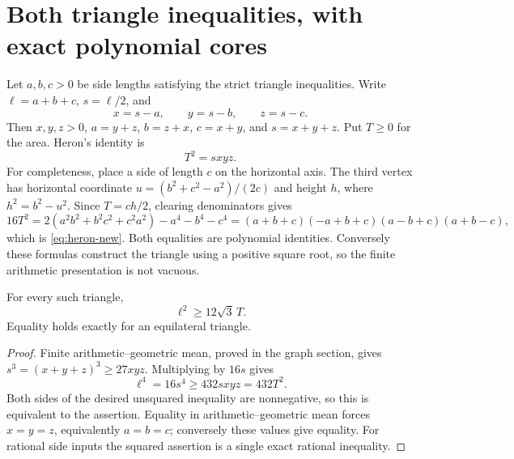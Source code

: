 \section{Both triangle inequalities, with exact polynomial cores}
\label{sec:triangles}

Let \(a,b,c>0\) be side lengths satisfying the strict triangle
inequalities. Write \(\ell=a+b+c\), \(s=\ell/2\), and
\[
 x=s-a,\qquad y=s-b,\qquad z=s-c.
\]
Then \(x,y,z>0\), \(a=y+z\), \(b=z+x\), \(c=x+y\),
and \(s=x+y+z\). Put \(T\geq0\) for the area. Heron's identity is
\begin{equation}\label{eq:heron-new}
 T^2=sxyz.
\end{equation}
For completeness, place a side of length \(c\) on the horizontal axis.
The third vertex has horizontal coordinate
\(u=(b^2+c^2-a^2)/(2c)\) and height \(h\), where
\(h^2=b^2-u^2\). Since \(T=ch/2\), clearing denominators gives
\[
 16T^2=2(a^2b^2+b^2c^2+c^2a^2)-a^4-b^4-c^4
 =(a+b+c)(-a+b+c)(a-b+c)(a+b-c),
\]
which is \eqref{eq:heron-new}. Both equalities are polynomial identities.
Conversely these formulas construct the triangle using a positive square
root, so the finite arithmetic presentation is not vacuous.

\begin{theorem}
For every such triangle,
\[
 \ell^2\geq12\sqrt3\,T.
\]
Equality holds exactly for an equilateral triangle.
\end{theorem}
\begin{proof}
Finite arithmetic--geometric mean, proved in the graph section, gives
\(s^3=(x+y+z)^3\geq27xyz\). Multiplying by \(16s\) gives
\[
 \ell^4=16s^4\geq432sxyz=432T^2.
\]
Both sides of the desired unsquared inequality are nonnegative, so this
is equivalent to the assertion. Equality in arithmetic--geometric mean
forces \(x=y=z\), equivalently \(a=b=c\); conversely these values
give equality. For rational side inputs the squared assertion is a
single exact rational inequality.
\end{proof}

